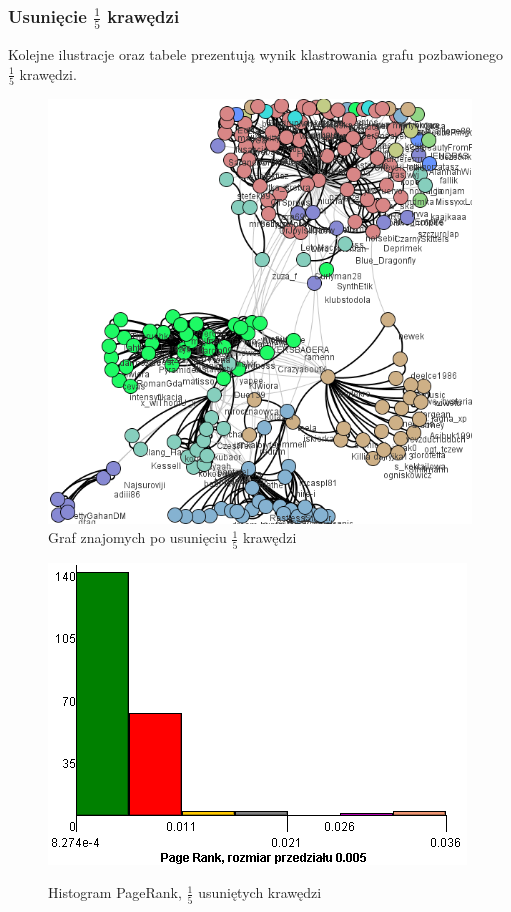\documentclass[10pt,a4paper]{article}
\begin{document}
\subsubsection {Usunięcie $\frac{1}{5}$ krawędzi}
Kolejne ilustracje oraz tabele prezentują wynik klastrowania grafu pozbawionego  $\frac{1}{5}$  krawędzi.
\begin{figure}[H]
\centering
\caption{Graf znajomych po usunięciu $\frac{1}{5}$ krawędzi}
\includegraphics[scale=0.6]{wyniki/final200Friends/1200friends.png}
\end{figure}

\begin{figure}[H]
\centering
\caption{Histogram PageRank, $\frac{1}{5}$ usuniętych krawędzi}
\includegraphics[scale=0.6]{wyniki/final200Friends/1200friendsPRHist.png}
\label{fig:1200friendsPRHist}
\end{figure}
\end{document}
